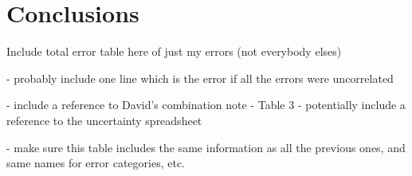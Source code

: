 
\section{Conclusions}



Include total error table here of just my errors (not everybody elses)

- probably include one line which is the error if all the errors were uncorrelated

- include a reference to David's combination note \cite{CombinationNote} - Table 3 
- potentially include a reference to the uncertainty spreadsheet \cite{UncertaintySpreadsheet}


- make sure this table includes the same information as all the previous ones, and same names for error categories, etc.

